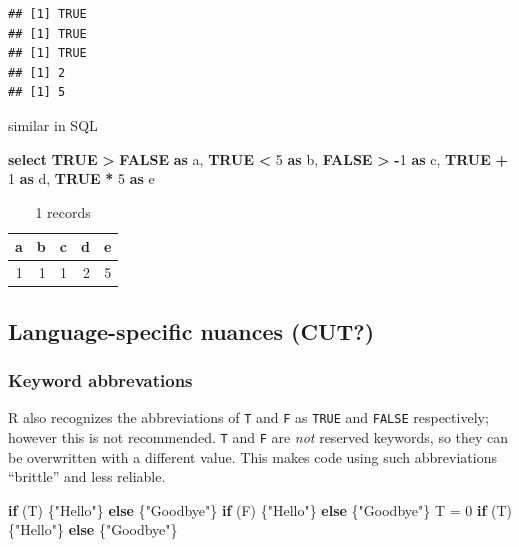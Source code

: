 \documentclass[
]{krantz}
\makeatletter
\newenvironment{Shaded}{\begin{snugshade}}{\end{snugshade}}
\newcommand{\ControlFlowTok}[1]{\textcolor[rgb]{0.27,0.27,0.27}{\textbf{#1}}}
\newcommand{\DecValTok}[1]{\textcolor[rgb]{0.06,0.06,0.06}{#1}}
\newcommand{\KeywordTok}[1]{\textcolor[rgb]{0.27,0.27,0.27}{\textbf{#1}}}
\newcommand{\NormalTok}[1]{#1}
\newcommand{\OperatorTok}[1]{\textcolor[rgb]{0.43,0.43,0.43}{\textbf{#1}}}
\newcommand{\OtherTok}[1]{\textcolor[rgb]{0.37,0.37,0.37}{#1}}
\newcommand{\StringTok}[1]{\textcolor[rgb]{0.5,0.5,0.5}{#1}}
\newenvironment{kframe}{%
\medskip{}
\setlength{\fboxsep}{.8em}
 \def\at@end@of@kframe{}%
 \ifinner\ifhmode%
  \def\at@end@of@kframe{\end{minipage}}%
  \begin{minipage}{\columnwidth}%
 \fi\fi%
 \def\FrameCommand##1{\hskip\@totalleftmargin \hskip-\fboxsep
 \colorbox{shadecolor}{##1}\hskip-\fboxsep
     \hskip-\linewidth \hskip-\@totalleftmargin \hskip\columnwidth}%
 \MakeFramed {\advance\hsize-\width
   \@totalleftmargin\z@ \linewidth\hsize
   \@setminipage}}%
 {\par\unskip\endMakeFramed%
 \at@end@of@kframe}
\renewenvironment{Shaded}{\begin{kframe}}{\end{kframe}}
\makeatother
\begin{document}
\begin{verbatim}
## [1] TRUE
## [1] TRUE
## [1] TRUE
## [1] 2
## [1] 5
\end{verbatim}

similar in SQL

\begin{Shaded}
\begin{Highlighting}[]
\KeywordTok{select}
  \KeywordTok{TRUE} \OperatorTok{\textgreater{}} \KeywordTok{FALSE} \KeywordTok{as}\NormalTok{ a,}
  \KeywordTok{TRUE} \OperatorTok{\textless{}} \DecValTok{5} \KeywordTok{as}\NormalTok{ b,}
  \KeywordTok{FALSE} \OperatorTok{\textgreater{}} \OperatorTok{{-}}\DecValTok{1} \KeywordTok{as}\NormalTok{ c,}
  \KeywordTok{TRUE} \OperatorTok{+} \DecValTok{1} \KeywordTok{as}\NormalTok{ d,}
  \KeywordTok{TRUE} \OperatorTok{*} \DecValTok{5} \KeywordTok{as}\NormalTok{ e}
\end{Highlighting}
\end{Shaded}

\begin{table}

\caption{\label{tab:unnamed-chunk-66}1 records}
\centering
\begin{tabular}[t]{r|r|r|r|r}
\hline
a & b & c & d & e\\
\hline
1 & 1 & 1 & 2 & 5\\
\hline
\end{tabular}
\end{table}

\hypertarget{language-specific-nuances-cut}{%
\subsection{Language-specific nuances (CUT?)}\label{language-specific-nuances-cut}}

\hypertarget{keyword-abbrevations}{%
\subsubsection{Keyword abbrevations}\label{keyword-abbrevations}}

R also recognizes the abbreviations of \texttt{T} and \texttt{F} as \texttt{TRUE} and \texttt{FALSE} respectively;
however this is not recommended.
\texttt{T} and \texttt{F} are \emph{not} reserved keywords, so they can be overwritten with a different value.
This makes code using such abbreviations ``brittle'' and less reliable.

\begin{Shaded}
\begin{Highlighting}[]
\ControlFlowTok{if}\NormalTok{ (T) \{}\StringTok{"Hello"}\NormalTok{\} }\ControlFlowTok{else}\NormalTok{ \{}\StringTok{"Goodbye"}\NormalTok{\}}
\ControlFlowTok{if}\NormalTok{ (F) \{}\StringTok{"Hello"}\NormalTok{\} }\ControlFlowTok{else}\NormalTok{ \{}\StringTok{"Goodbye"}\NormalTok{\}}
\NormalTok{T }\OtherTok{=} \DecValTok{0}
\ControlFlowTok{if}\NormalTok{ (T) \{}\StringTok{"Hello"}\NormalTok{\} }\ControlFlowTok{else}\NormalTok{ \{}\StringTok{"Goodbye"}\NormalTok{\}}
\end{Highlighting}
\end{Shaded}
\end{document}
